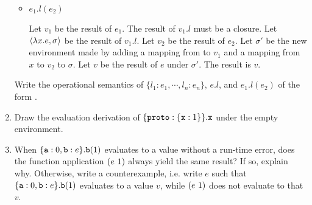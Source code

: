 \begin{exercise}
\begin{enumerate}
\begin{itemize}
      \item $e_1.l(e_2)$

        Let $v_1$ be the result of $e_1$.  The result of $v_1.l$ must be a
        closure. Let $\langle\lambda x.e,\sigma\rangle$ be the result of $v_1.l$.  Let $v_2$
        be the result of $e_2$.  Let $\sigma'$ be the new environment made by
        adding a mapping from  to $v_1$ and a mapping from $x$ to
        $v_2$ to $\sigma$.  Let $v$ be the result of $e$ under $\sigma'$.  The
        result is $v$.

    \end{itemize}
    Write the operational semantics of $\{l_1:e_1,\cdots,l_n:e_n\}$, $e.l$, and
    $e_1.l(e_2)$ of the form .

  \item Draw the evaluation derivation of $\{\texttt{proto}:\{\texttt{x}:1\}\}.\texttt{x}$ under
    the empty environment.

  \item
    When $\{ \texttt{a}:0, \texttt{b}:e \}.\texttt{b}(1)$ evaluates to a value without a run-time
    error, does the function
    application $(e\ 1)$ always yield the same result? If so, explain why. Otherwise,
    write a counterexample, i.e. write $e$ such that
    $\{ \texttt{a}:0, \texttt{b}:e \}.\texttt{b}(1)$ evaluates to a value $v$, while
    $(e\ 1)$ does not evaluate to that $v$.

\end{enumerate}

\end{exercise}

